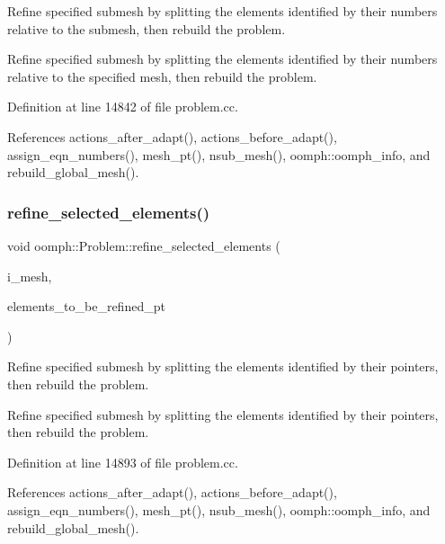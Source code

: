 Refine specified submesh by splitting the elements identified by their numbers relative to the submesh, then rebuild the problem. 

Refine specified submesh by splitting the elements identified by their numbers relative to the specified mesh, then rebuild the problem. 

Definition at line 14842 of file problem.\+cc.



References actions\+\_\+after\+\_\+adapt(), actions\+\_\+before\+\_\+adapt(), assign\+\_\+eqn\+\_\+numbers(), mesh\+\_\+pt(), nsub\+\_\+mesh(), oomph\+::oomph\+\_\+info, and rebuild\+\_\+global\+\_\+mesh().

\mbox{\label{classoomph_1_1Problem_ac11c04e70c664547f88ad084af4762b2}} 
\subsubsection{\texorpdfstring{refine\+\_\+selected\+\_\+elements()}{refine\_selected\_elements()}\hspace{0.1cm}{\footnotesize\ttfamily [4/6]}}
{\footnotesize\ttfamily void oomph\+::\+Problem\+::refine\+\_\+selected\+\_\+elements (\begin{DoxyParamCaption}\item[{const unsigned \&}]{i\+\_\+mesh,  }\item[{const \hyperlink{classoomph_1_1Vector}{Vector}$<$ \hyperlink{classoomph_1_1RefineableElement}{Refineable\+Element} $\ast$$>$ \&}]{elements\+\_\+to\+\_\+be\+\_\+refined\+\_\+pt }\end{DoxyParamCaption})}



Refine specified submesh by splitting the elements identified by their pointers, then rebuild the problem. 

Refine specified submesh by splitting the elements identified by their pointers, then rebuild the problem. 

Definition at line 14893 of file problem.\+cc.



References actions\+\_\+after\+\_\+adapt(), actions\+\_\+before\+\_\+adapt(), assign\+\_\+eqn\+\_\+numbers(), mesh\+\_\+pt(), nsub\+\_\+mesh(), oomph\+::oomph\+\_\+info, and rebuild\+\_\+global\+\_\+mesh().

